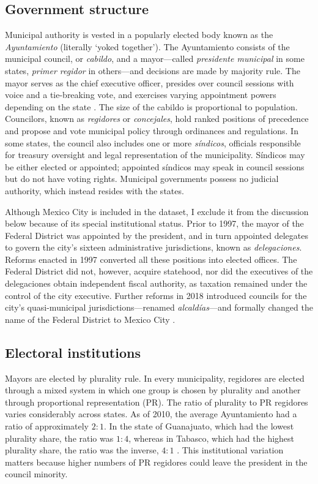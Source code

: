\documentclass[letter,12pt]{article}
\begin{document}
\subsection{Government structure}\label{S:structure}
Municipal authority is vested in a popularly elected body known as the \emph{Ayuntamiento} (literally `yoked together'). The Ayuntamiento consists of the municipal council, or \emph{cabildo}, and a mayor---called \emph{presidente municipal} in some states, \emph{primer regidor} in others---and decisions are made by majority rule. The mayor serves as the chief executive officer, presides over council sessions with voice and a tie-breaking vote, and exercises varying appointment powers depending on the state \citep{robles-mtz.Municipio.2009, rmz-millan.2000}. The size of the cabildo is proportional to population. Councilors, known as \emph{regidores} or \emph{concejales}, hold ranked positions of precedence and propose and vote municipal policy through ordinances and regulations. In some states, the council also includes one or more \emph{síndicos}, officials responsible for treasury oversight and legal representation of the municipality. Síndicos may be either elected or appointed; appointed síndicos may speak in council sessions but do not have voting rights. Municipal governments possess no judicial authority, which instead resides with the states.

Although Mexico City is included in the dataset, I exclude it from the discussion below because of its special institutional status. Prior to 1997, the mayor of the Federal District was appointed by the president, and in turn appointed delegates to govern the city’s sixteen administrative jurisdictions, known as \emph{delegaciones}. Reforms enacted in 1997 converted all these positions into elected offices. The Federal District did not, however, acquire statehood, nor did the executives of the delegaciones obtain independent fiscal authority,  as taxation remained under the control of the city executive. Further reforms in 2018 introduced councils for the city's quasi-municipal jurisdictions---renamed \emph{alcaldías}---and formally changed the name of the Federal District to Mexico City \citep{rabell.2017}. 

\subsection{Electoral institutions}
Mayors are elected by plurality rule. In every municipality, regidores are elected through a mixed system in which one group is chosen by plurality and another through proportional representation (PR). The ratio of plurality to PR regidores varies considerably across states. As of 2010, the average Ayuntamiento had a ratio of approximately $2:1$. In the state of Guanajuato, which had the lowest plurality share, the ratio was $1:4$, whereas in Tabasco, which had the highest plurality share, the ratio was the inverse, $4:1$ \citep[][:14]{gil.2010}. This institutional variation matters because higher numbers of PR regidores could leave the president in the council minority.
\end{document}
